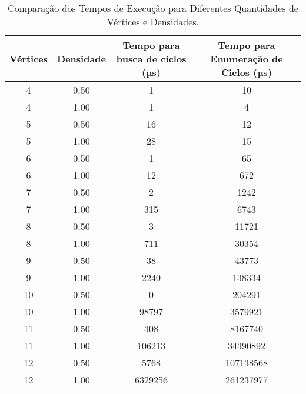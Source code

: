 \begin{table}[ht]
\centering
\begin{tabular}{|c|c|c|c|}
\hline
Vértices & Densidade & Tempo para busca de ciclos (µs) & Tempo para Enumeração de Ciclos (µs) \\
\hline
4 & 0.50 & 1 & 10 \\
4 & 1.00 & 1 & 4 \\
5 & 0.50 & 16 & 12 \\
5 & 1.00 & 28 & 15 \\
6 & 0.50 & 1 & 65 \\
6 & 1.00 & 12 & 672 \\
7 & 0.50 & 2 & 1242 \\
7 & 1.00 & 315 & 6743 \\
8 & 0.50 & 3 & 11721 \\
8 & 1.00 & 711 & 30354 \\
9 & 0.50 & 38 & 43773 \\
9 & 1.00 & 2240 & 138334 \\
10 & 0.50 & 0 & 204291 \\
10 & 1.00 & 98797 & 3579921 \\
11 & 0.50 & 308 & 8167740 \\
11 & 1.00 & 106213 & 34390892 \\
12 & 0.50 & 5768 & 107138568 \\
12 & 1.00 & 6329256 & 261237977 \\
\hline
\end{tabular}
\caption{Comparação dos Tempos de Execução para Diferentes Quantidades de Vértices e Densidades.}
\label{table:execution_times}
\end{table}
